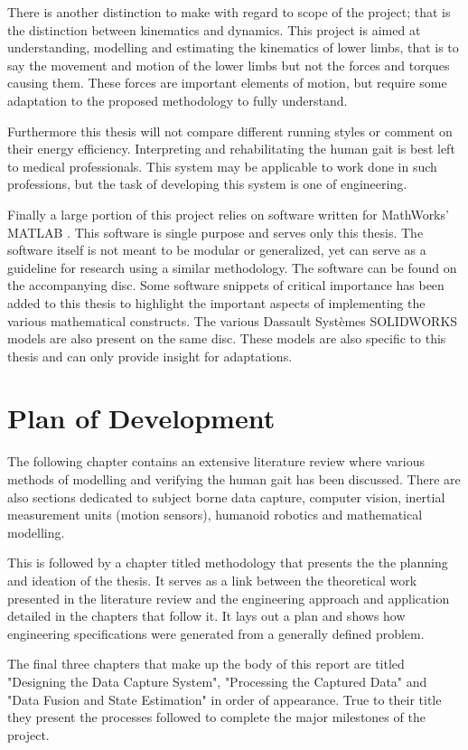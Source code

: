 There is another distinction to make with regard to scope of the project; that is the distinction between kinematics and dynamics. This project is aimed at understanding, modelling and estimating the kinematics of lower limbs, that is to say the movement and motion of the lower limbs but not the forces and torques causing them. These forces are important elements of motion, but require some adaptation to the proposed methodology to fully understand.

Furthermore this thesis will not compare different running styles or comment on their energy efficiency. Interpreting and rehabilitating the human gait is best left to medical professionals. This system may be applicable to work done in such professions, but the task of developing this system is one of engineering.

Finally a large portion of this project relies on software written for MathWorks' MATLAB \cite{matlab}. This software is single purpose and serves only this thesis. The software itself is not meant to be modular or generalized, yet can serve as a guideline for research using a similar methodology. The software can be found on the accompanying disc. Some software snippets of critical importance has been added to this thesis to highlight the important aspects of implementing the various mathematical constructs. The various Dassault Systèmes SOLIDWORKS \cite{solidworks} models are also present on the same disc. These models are also specific to this thesis and can only provide insight for adaptations. 

\section{Plan of Development}
The following chapter contains an extensive literature review where various methods of modelling and verifying the human gait has been discussed. There are also sections dedicated to subject borne data capture, computer vision, inertial measurement units (motion sensors), humanoid robotics and mathematical modelling.

This is followed by a chapter titled methodology that presents the the planning and ideation of the thesis. It serves as a link between the theoretical work presented in the literature review and the engineering approach and application detailed in the chapters that follow it. It lays out a plan and shows how engineering specifications were generated from a generally defined problem. 

The final three chapters that make up the body of this report are titled "Designing the Data Capture System", "Processing the Captured Data" and "Data Fusion and State Estimation" in order of appearance. True to their title they present the processes followed to complete the major milestones of the project.

